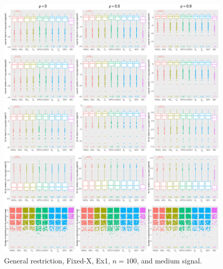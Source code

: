 \clearpage
\begin{figure}[!ht]
\centering
\includegraphics[width=\textwidth]{figures/supplement/fixedx/general_restriction/Ex1_n100_msnr.eps}
\caption{General restriction, Fixed-X, Ex1, $n=100$, and medium signal.}
\end{figure}
\clearpage
